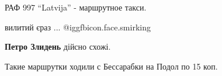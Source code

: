  
 
 
 
 

РАФ 997 \enquote{Latvija} - маршрутное такси.

вилитий єраз ... @igg{fbicon.face.smirking} 

\textbf{Петро Злидень} дійсно схожі.

Такие маршрутки ходили с Бессарабки на Подол по 15 коп.
